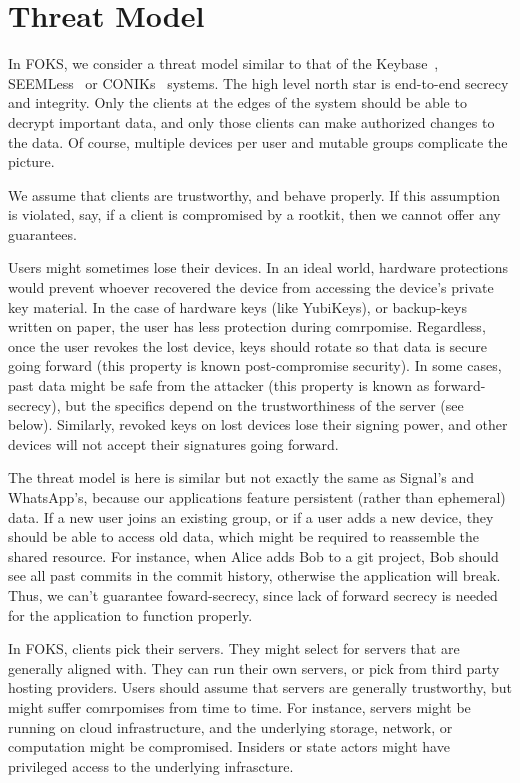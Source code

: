 
\section{Threat Model}
\label{sec:threatmodel}

In FOKS, we consider a threat model similar to that of the Keybase~\cite{keybase},
SEEMLess~\cite{chase2019seemless} or CONIKs~\cite{melara2015coniks} systems.
The high level north star is end-to-end secrecy and integrity. Only the clients
at the edges of the system should be able to decrypt important data, and only
those clients can make authorized changes to the data. Of course, multiple
devices per user and mutable groups complicate the picture.

We assume that clients are trustworthy, and behave properly. If this assumption
is violated, say, if a client is compromised by a rootkit, then we cannot
offer any guarantees. 

Users might sometimes lose their devices. In an ideal world, hardware protections
would prevent whoever recovered the device from accessing the device's private
key material. In the case of hardware keys (like YubiKeys), or backup-keys
written on paper, the user has less protection during comrpomise. Regardless,
once the user revokes the lost device, keys should rotate so that data is secure
going forward (this property is known post-compromise security). In some cases,
past data might be safe from the attacker (this property is known as forward-secrecy),
but the specifics depend on the trustworthiness of the server (see below). Similarly, revoked
keys on lost devices lose their signing power, and other devices will not accept
their signatures going forward.

The threat model is here is similar but not exactly the same as Signal's and
WhatsApp's, because our applications feature persistent (rather than ephemeral)
data. If a new user joins an existing group, or if a user adds a new device,
they should be able to access old data, which might be required to reassemble the
shared resource. For instance, when Alice adds Bob to a git project, Bob
should see all past commits in the commit history, otherwise the
application will break. Thus, we can't guarantee foward-secrecy, since
lack of forward secrecy is needed for the application to function properly.

In FOKS, clients pick their servers. They might select for servers
that are generally aligned with. They can run their own servers, or pick 
from third party hosting providers. Users should assume that servers
are generally trustworthy, but might suffer comrpomises from time to time.
For instance, servers might be running on cloud infrastructure, and the underlying
storage, network, or computation might be compromised. Insiders or state actors
might have privileged access to the underlying infrascture. 

